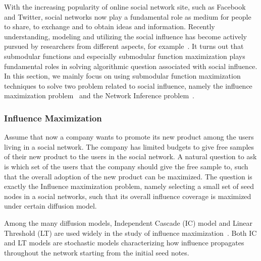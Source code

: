 With the increasing popularity of online social network site, such as Facebook and Twitter, social networks now play a fundamental role as medium for people to share, to exchange and to obtain ideas and information. Recently understanding, modeling and utilizing the social influence has become actively pursued by researchers from different aspects, for example~\cite{GJA10,KKT03,GB12,Bharathi:2007,Borodin:2010,chen2011influence,he2012influence,Budak:2011}. It turns out that submodular functions and especially submodular function maximization plays fundamental roles in solving algorithmic question associated with social influence. In this section, we mainly focus on using submodular function maximization techniques to solve two problem related to social influence, namely the influence maximization problem~\cite{KKT03} and the Network Inference problem~\cite{GJA10}.

\subsubsection{Influence Maximization}
Assume that now a company wants to promote its new product among the users living in a social network. The company has limited budgets to give free samples of their new product to the users in the social network. A natural question to ask is which set of the users that the company should give the free sample to, such that the overall adoption of the new product can be maximized. The question is exactly the Influence maximization problem, namely selecting a small set of seed nodes in a social networks, such that its overall influence coverage is maximized under certain diffusion model.

Among the many diffusion models, Independent Cascade (IC) model and Linear Threshold (LT) are used widely in the study of influence maximization~\cite{KKT03}. Both IC and LT models are stochastic models characterizing how influence propagates throughout the network starting from the initial seed notes.

%

